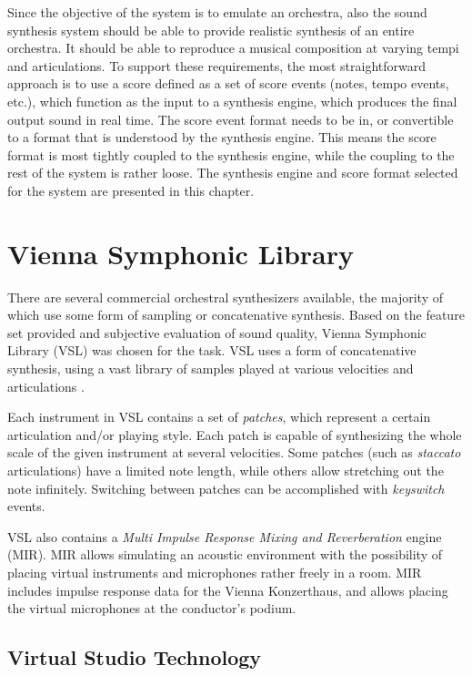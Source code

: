 Since the objective of the system is to emulate an orchestra,
also the sound synthesis system should be able to
provide realistic synthesis of an entire orchestra.
It should be able to reproduce a musical composition
at varying tempi and articulations.
To support these requirements,
the most straightforward approach is to use
a score defined as a set of score events
(notes, tempo events, etc.),
which function as the input to a synthesis engine,
which produces the final output sound in real time.
The score event format needs to be in,
or convertible to a format that is understood by the synthesis engine.
This means the score format is most tightly
coupled to the synthesis engine,
while the coupling to the rest of the system is rather loose.
The synthesis engine and score format selected for the system
are presented in this chapter.

\section{Vienna Symphonic Library}

There are several commercial orchestral synthesizers available,
the majority of which use some form of sampling or concatenative synthesis.
Based on the feature set provided and
subjective evaluation of sound quality,
Vienna Symphonic Library (VSL) \cite{vsl} was chosen for the task.
VSL uses a form of concatenative synthesis,
using a vast library of samples played at
various velocities and articulations \cite{schwartz2006}.

Each instrument in VSL contains a set of \textit{patches},
which represent a certain articulation and/or playing style.
Each patch is capable of synthesizing
the whole scale of the given instrument at several velocities.
Some patches (such as \textit{staccato} articulations)
have a limited note length,
while others allow stretching out the note infinitely.
Switching between patches can be accomplished with \textit{keyswitch} events.

VSL also contains a \textit{Multi Impulse Response Mixing and Reverberation}
engine (MIR).
MIR allows simulating an acoustic environment with
the possibility of placing virtual instruments and microphones
rather freely in a room.
MIR includes impulse response data for the Vienna Konzerthaus,
and allows placing the virtual microphones at the conductor's podium.

\subsection{Virtual Studio Technology}

